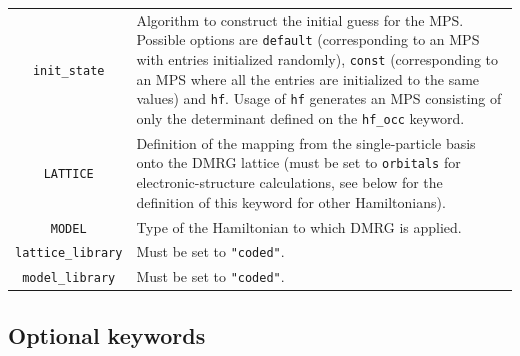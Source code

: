 \documentclass[bibliography=totoc,12pt,a4paper]{scrartcl}
\begin{document}
\begin{table}
\begin{tabular}{cV{11.5cm}}
    \texttt{init\_state} 
					 & Algorithm to construct the initial guess for the MPS.
					   Possible options are \texttt{default} (corresponding to an MPS with entries
					   initialized randomly), \texttt{const} (corresponding to an MPS where all
					   the entries are initialized to the same values) and \texttt{hf}.
				 	   Usage of \texttt{hf} generates an MPS consisting of only the determinant
					   defined on the \texttt{hf\_occ} keyword. \\
	\texttt{LATTICE} & Definition of the mapping from the single-particle basis onto the DMRG 
					   lattice (must be set to \texttt{orbitals} for electronic-structure calculations, see below for the definition of this keyword for other 
					   Hamiltonians). \\
	\texttt{MODEL}   & Type of the Hamiltonian to which DMRG is applied. \\
    \texttt{lattice\_library} 
					 & Must be set to \texttt{"coded"}. \\
	\texttt{model\_library}
					 & Must be set to \texttt{"coded"}. \\
    \bottomrule
  \end{tabular}
\end{table}

\subsection{Optional keywords}
\label{subsec:optional-qcm}
\end{document}

